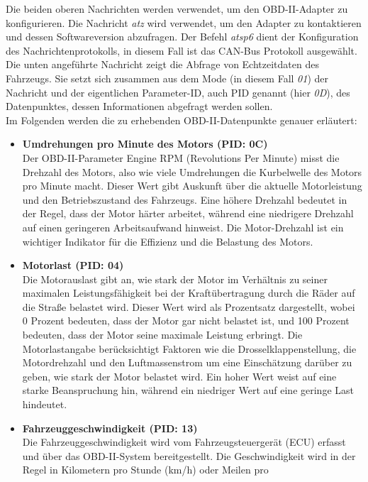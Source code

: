 \documentclass[oneside]{ausarbeitung}
\begin{document}
Die beiden oberen Nachrichten werden verwendet, um den OBD-II-Adapter zu konfigurieren. Die Nachricht \textit{atz} wird verwendet,
um den Adapter zu kontaktieren und dessen Softwareversion abzufragen. Der Befehl \textit{atsp6} dient der Konfiguration des Nachrichtenprotokolls,
in diesem Fall ist das CAN-Bus Protokoll ausgewählt.
Die unten angeführte Nachricht zeigt die Abfrage von Echtzeitdaten des Fahrzeugs. Sie setzt sich zusammen aus dem Mode (in diesem Fall \textit{01}) der Nachricht und der 
eigentlichen Parameter-ID, auch PID genannt (hier \textit{0D}), des Datenpunktes, dessen Informationen abgefragt werden sollen.
\\
Im Folgenden werden die zu erhebenden OBD-II-Datenpunkte genauer erläutert:
\begin{itemize}
  \item \textbf{Umdrehungen pro Minute des Motors (PID: 0C)} \\ Der OBD-II-Parameter Engine RPM (Revolutions Per Minute) misst die Drehzahl 
  des Motors, also wie viele Umdrehungen die Kurbelwelle des Motors pro Minute macht. Dieser Wert gibt Auskunft über die aktuelle 
  Motorleistung und den Betriebszustand des Fahrzeugs. Eine höhere Drehzahl bedeutet in der Regel, dass der Motor härter arbeitet, 
  während eine niedrigere Drehzahl auf einen geringeren Arbeitsaufwand hinweist. Die Motor-Drehzahl ist ein wichtiger Indikator 
  für die Effizienz und die Belastung des Motors.
  \item \textbf{Motorlast (PID: 04)} \\ Die Motorauslast gibt an, wie stark der Motor im Verhältnis zu seiner maximalen 
  Leistungsfähigkeit bei der Kraftübertragung durch die Räder auf die Straße belastet wird. Dieser Wert wird als Prozentsatz
  dargestellt, wobei 0 Prozent bedeuten, dass der Motor gar nicht belastet ist, und 100 Prozent bedeuten, dass der Motor seine 
  maximale Leistung erbringt.
  Die Motorlastangabe berücksichtigt Faktoren wie die Drosselklappenstellung, die Motordrehzahl und den Luftmassenstrom
  um eine Einschätzung darüber zu geben, wie stark der Motor belastet wird. Ein hoher Wert weist auf eine starke 
  Beanspruchung hin, während ein niedriger Wert auf eine geringe Last hindeutet.
  \item \textbf{Fahrzeuggeschwindigkeit (PID: 13)} \\  Die Fahrzeuggeschwindigkeit wird vom Fahrzeugsteuergerät (ECU) erfasst und über 
  das OBD-II-System bereitgestellt. Die Geschwindigkeit wird in der Regel in Kilometern pro Stunde (km/h) oder Meilen pro 

\end{itemize}
\end{document}

